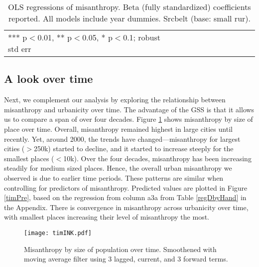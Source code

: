 \documentclass[11pt, letterpaper]{article}
\begin{document}
\begin{spacing}{1.4}
\begin{table}[H]\centering
\caption{OLS regressions  of misanthropy. Beta (fully standardized) coefficients
  reported. All models include year dummies. Srcbelt (base: small rur).} \label{regC}
\begin{scriptsize} \begin{tabular}{p{1.8in}p{.45in}p{.45in}p{.45in}p{.45in}p{.45in}p{.45in}p{.45in}p{.45in}p{.45in}p{.45 in}}\hline

\hline  *** p$<$0.01, ** p$<$0.05, * p$<$0.1; robust std err
\end{tabular}\end{scriptsize}\end{table}



\subsection*{A look over time}

Next, we complement our analysis by exploring the relationship between misanthropy and urbanicity over time. The advantage of the GSS is that it allows us to compare a span of over four decades. Figure \ref{tim} shows misanthropy by size of place over time. Overall, misanthropy remained highest in large cities until recently. Yet, around 2000, the trends have changed---misanthropy for largest cities ($>$250k) started to decline, and it started to increase steeply for the smallest places ($<$10k). Over the four decades, misanthropy has been increasing steadily for medium sized places. Hence, the overall urban misanthropy we observed is due to earlier time periods. 
%
These patterns are similar when controlling for predictors of
misanthropy. Predicted values are plotted in Figure \ref{timPre}, based on the regression from column a3a from Table \ref{regDbyHand} in the Appendix. There is convergence in misanthropy across urbanicity over time, with smallest places increasing their level of misanthropy the most.  
 

\begin{figure}[H]
  \texttt{[image: timINK.pdf]}\centering
\caption{Misanthropy by size of population over time. Smoothened with moving
  average filter using 3 lagged, current, and 3 forward terms.}\label{tim}%
\end{figure}




\end{spacing}
\end{document}
